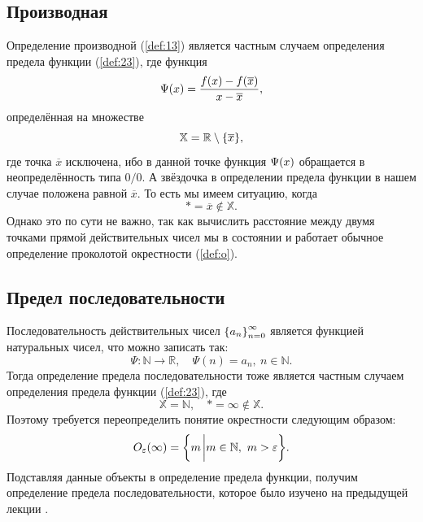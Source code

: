 \documentclass[12pt]{article}
\begin{document}
\subsection{Производная}
Определение производной (\ref{def:13}) является частным случаем определения предела функции (\ref{def:23}), где функция 
\begin{equation}
    \Psi\qty(x) = \dfrac{f(x) - f(\overline{x})}{ x-\overline{x}},
\end{equation}
определённая на множестве
\begin{equation}
    \mathbb{X} = \mathbb{R}\setminus\qty{\overline{x}},
\end{equation}
где точка $\overline{x}$ исключена, ибо в данной точке функция $\Psi\qty(x)$ обращается в неопределённость типа $0/0$. А звёздочка в определении предела функции в нашем случае положена равной $\overline{x}$. То есть мы имеем ситуацию, когда 
\begin{equation}
    *=\overline{x}\notin \mathbb{X}.
\end{equation}
Однако это по сути не важно, так как вычислить расстояние между двумя точками прямой действительных чисел мы в состоянии и работает обычное определение проколотой окрестности (\ref{def:o}).
\subsection{Предел последовательности}
Последовательность действительных чисел $\qty{a_n}_{n=0}^\infty$ является функцией натуральных чисел, что можно записать так:
\begin{equation}
    \Psi: \mathbb{N}\longrightarrow\mathbb{R}, \quad \Psi(n) = a_n,\ n \in \mathbb{N}.
\end{equation}
Тогда определение предела последовательности тоже является частным случаем определения предела функции (\ref{def:23}), где 
\begin{equation}
    \mathbb{X} = \mathbb{N},\quad *=\infty\notin \mathbb{X}.
\end{equation}
Поэтому требуется переопределить понятие окрестности следующим образом:
\begin{equation}
    O_\varepsilon\qty(\infty) = \qty{m\eval m\in \mathbb{N},\ m>\varepsilon}.
\end{equation}
Подставляя данные объекты в определение предела функции, получим определение предела последовательности, которое было изучено на предыдущей лекции \cite{lim}.
\end{document}
